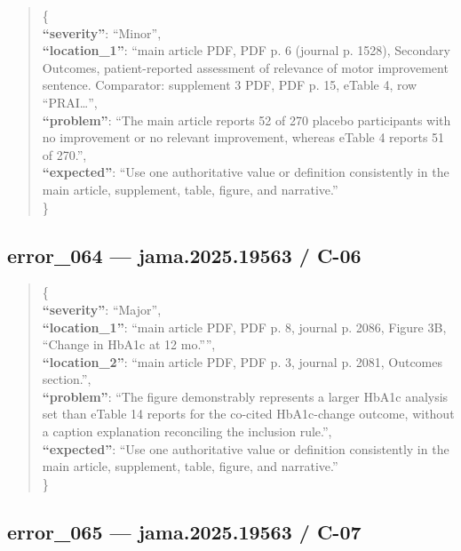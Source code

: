 \documentclass[
  letterpaper,
  9pt]{extreport}
\begin{document}
\begin{quote}
\{\\
\textbf{``severity''}: ``Minor'',\\
\textbf{``location\_1''}: ``main article PDF, PDF p. 6 (journal p.
1528), Secondary Outcomes, patient-reported assessment of relevance of
motor improvement sentence. Comparator: supplement 3 PDF, PDF p. 15,
eTable 4, row ``PRAI\ldots{}'',\\
\textbf{``problem''}: ``The main article reports 52 of 270 placebo
participants with no improvement or no relevant improvement, whereas
eTable 4 reports 51 of 270.'',\\
\textbf{``expected''}: ``Use one authoritative value or definition
consistently in the main article, supplement, table, figure, and
narrative.''\\
\}
\end{quote}

\hypertarget{error_064--jama202519563--c-06}{%
\subsection{error\_064 --- jama.2025.19563 /
C-06}\label{error_064--jama202519563--c-06}}

\begin{quote}
\{\\
\textbf{``severity''}: ``Major'',\\
\textbf{``location\_1''}: ``main article PDF, PDF p. 8, journal p. 2086,
Figure 3B, ``Change in HbA1c at 12 mo.'''',\\
\textbf{``location\_2''}: ``main article PDF, PDF p. 3, journal p. 2081,
Outcomes section.'',\\
\textbf{``problem''}: ``The figure demonstrably represents a larger
HbA1c analysis set than eTable 14 reports for the co-cited HbA1c-change
outcome, without a caption explanation reconciling the inclusion
rule.'',\\
\textbf{``expected''}: ``Use one authoritative value or definition
consistently in the main article, supplement, table, figure, and
narrative.''\\
\}
\end{quote}

\hypertarget{error_065--jama202519563--c-07}{%
\subsection{error\_065 --- jama.2025.19563 /
C-07}\label{error_065--jama202519563--c-07}}
\end{document}
